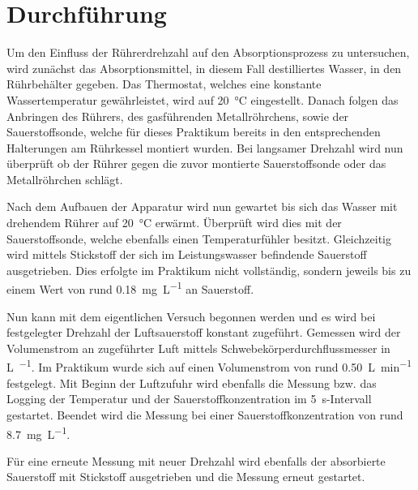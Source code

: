 \section{Durchführung}
\label{sec:durchfuerung}

Um den Einfluss der Rührerdrehzahl auf den Absorptionsprozess zu untersuchen, wird zunächst das Absorptionsmittel, in diesem Fall destilliertes Wasser, in den Rührbehälter gegeben.
Das Thermostat, welches eine konstante Wassertemperatur gewährleistet, wird auf \SI{20}{\celsius} eingestellt. Danach folgen das Anbringen des Rührers, des gasführenden Metallröhrchens, sowie der Sauerstoffsonde, welche für dieses Praktikum bereits in den entsprechenden Halterungen am Rührkessel montiert wurden. 
Bei langsamer Drehzahl wird nun überprüft ob der Rührer gegen die zuvor montierte Sauerstoffsonde oder das Metallröhrchen schlägt.

Nach dem Aufbauen der Apparatur wird nun gewartet bis sich das Wasser mit drehendem Rührer auf \SI{20}{\celsius} erwärmt. Überprüft wird dies mit der Sauerstoffsonde, welche ebenfalls einen Temperaturfühler besitzt.
Gleichzeitig wird mittels Stickstoff der sich im Leistungswasser befindende Sauerstoff ausgetrieben. Dies erfolgte im Praktikum nicht vollständig, sondern jeweils bis zu einem Wert von rund \SI{0,18}{\milli \gram \per \liter} an Sauerstoff.

Nun kann mit dem eigentlichen Versuch begonnen werden und es wird bei festgelegter Drehzahl der Luftsauerstoff konstant zugeführt. Gemessen wird der Volumenstrom an zugeführter Luft mittels Schwebekörperdurchflussmesser in \si{\liter \per \min}. Im Praktikum wurde sich auf einen Volumenstrom von rund \SI{0,50}{\liter \per \minute} festgelegt.
Mit Beginn der Luftzufuhr wird ebenfalls die Messung bzw. das Logging der Temperatur und der Sauerstoffkonzentration im \SI{5}{\second}-Intervall gestartet.
Beendet wird die Messung bei einer Sauerstoffkonzentration von rund \SI{8,7}{\milli\gram \per \liter}.

Für eine erneute Messung mit neuer Drehzahl wird ebenfalls der absorbierte Sauerstoff mit Stickstoff ausgetrieben und die Messung erneut gestartet.